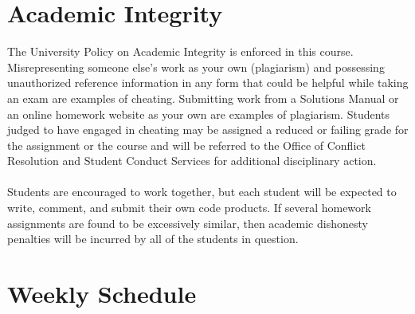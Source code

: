 \documentclass[11pt]{article}
\begin{document}
\section*{Academic Integrity}
The University Policy on Academic Integrity is enforced in this course.
Misrepresenting someone else’s work as your own (plagiarism) and possessing unauthorized reference
information in any form that could be helpful while taking an exam are examples of cheating. Submitting
work from a Solutions Manual or an online homework website as your own are examples of plagiarism.
Students judged to have engaged in cheating may be assigned a reduced or failing grade for the
assignment or the course and will be referred to the Office of Conflict Resolution and Student Conduct
Services for additional disciplinary action. \\
\\
Students are encouraged to work together, but each student will be expected to write, comment, and submit their own code products. If several homework assignments are found to be excessively similar, then academic dishonesty penalties will be incurred by all of the students in question.


\bigskip

\section*{Weekly Schedule}

\small
\end{document}
